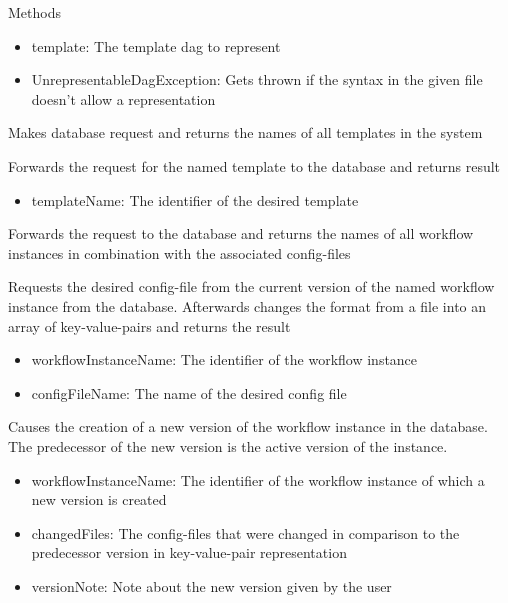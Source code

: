 \begin{methodenv}{Methods}
\begin{itemize}
	\item{template:}
	The template dag to represent
\end{itemize}

\begin{itemize}
	\item{UnrepresentableDagException:}
	Gets thrown if the syntax in the given file doesn't allow a representation
\end{itemize}

Makes database request and returns the names of all templates in the system

Forwards the request for the named template to the database and returns result

\begin{itemize}
	\item{templateName:}
	The identifier of the desired template
\end{itemize}

Forwards the request to the database and returns the names of all workflow instances in combination with the associated config-files

Requests the desired config-file from the current version of the named workflow instance from the database. Afterwards changes the format from a file into an array of key-value-pairs and returns the result

\begin{itemize}
	\item{workflowInstanceName:}
	The identifier of the workflow instance
	\item{configFileName:}
	The name of the desired config file
\end{itemize}

Causes the creation of a new version of the workflow instance in the database. The predecessor of the new version is the active version of the instance.

\begin{itemize}
	\item{workflowInstanceName:}
	The identifier of the workflow instance of which a new version is created
	\item{changedFiles:}
	The config-files that were changed in comparison to the predecessor version in key-value-pair representation
	\item{versionNote:}
	Note about the new version given by the user
\end{itemize}


\end{methodenv}
